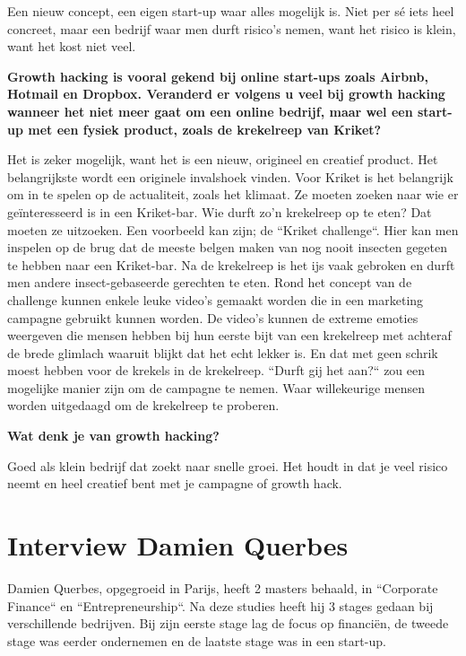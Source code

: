 Een nieuw concept, een eigen start-up waar alles mogelijk is. Niet per sé iets heel concreet, maar een bedrijf waar men durft risico's nemen, want het risico is klein, want het kost niet veel.

\textbf{Growth hacking is vooral gekend bij online start-ups zoals Airbnb, Hotmail en Dropbox. Veranderd er volgens u veel bij growth hacking wanneer het niet meer gaat om een online bedrijf, maar wel een start-up met een fysiek product, zoals de krekelreep van Kriket?}

Het is zeker mogelijk, want het is een nieuw, origineel en creatief product. Het belangrijkste wordt een originele invalshoek vinden. Voor Kriket is het belangrijk om in te spelen op de actualiteit, zoals het klimaat. Ze moeten zoeken naar wie er geïnteresseerd is in een Kriket-bar. Wie durft zo'n krekelreep op te eten? Dat moeten ze uitzoeken. Een voorbeeld kan zijn; de ``Kriket challenge``. Hier kan men inspelen op de brug dat de meeste belgen maken van nog nooit insecten gegeten te hebben naar een Kriket-bar. Na de krekelreep is het ijs vaak gebroken en durft men andere insect-gebaseerde gerechten te eten. Rond het concept van de challenge kunnen enkele leuke video's gemaakt worden die in een marketing campagne gebruikt kunnen worden. De video's kunnen de extreme emoties weergeven die mensen hebben bij hun eerste bijt van een krekelreep met achteraf de brede glimlach waaruit blijkt dat het echt lekker is. En dat met geen schrik moest hebben voor de krekels in de krekelreep. ``Durft gij het aan?`` zou een mogelijke manier zijn om de campagne te nemen. Waar willekeurige mensen worden uitgedaagd om de krekelreep te proberen.

\textbf{Wat denk je van growth hacking?}

Goed als klein bedrijf dat zoekt naar snelle groei. Het houdt in dat je veel risico neemt en heel creatief bent met je campagne of growth hack.
	

\section{Interview Damien Querbes}
\label{sec:interview-damien}

Damien Querbes, opgegroeid in Parijs, heeft 2 masters behaald, in ``Corporate Finance`` en ``Entrepreneurship``. Na deze studies heeft hij 3 stages gedaan bij verschillende bedrijven. Bij zijn eerste stage lag de focus op financiën, de tweede stage was eerder ondernemen en de laatste stage was in een start-up. 

